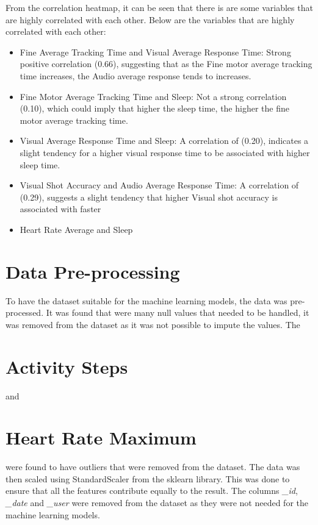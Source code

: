 From the correlation heatmap, it can be seen that there is are some variables that are highly correlated with each other. Below are the variables that are highly correlated with each other:

\begin{itemize}
    \item Fine Average Tracking Time and Visual Average Response Time: Strong positive correlation (0.66), suggesting that as the Fine motor average tracking time increases, 
    the Audio average response tends to increases.
    \item Fine Motor Average Tracking Time and Sleep: Not a strong correlation (0.10), which could imply that higher the sleep time, the higher the fine motor average tracking time.
    \item Visual Average Response Time and Sleep: A correlation of (0.20), indicates a slight tendency for a higher visual response time to be associated with higher sleep time.
    \item Visual Shot Accuracy and Audio Average Response Time: A correlation of (0.29), suggests a slight tendency that higher Visual shot accuracy is associated with faster 
    \item Heart Rate Average and Sleep
\end{itemize}



\section{Data Pre-processing}
To have the dataset suitable for the machine learning models, the data was pre-processed. It was found that were many null values that needed to be handled, 
it was removed from the dataset as it was not possible to impute the values. The \section{Activity Steps} and \section{Heart Rate Maximum} were found to have
outliers that were removed from the dataset. The data was then scaled using StandardScaler from the sklearn library. This was done to ensure that all the features
contribute equally to the result.
The columns \textit{\_id}, \textit{\_date} and \textit{\_user} were removed from the dataset as they were not needed for the machine learning models.


